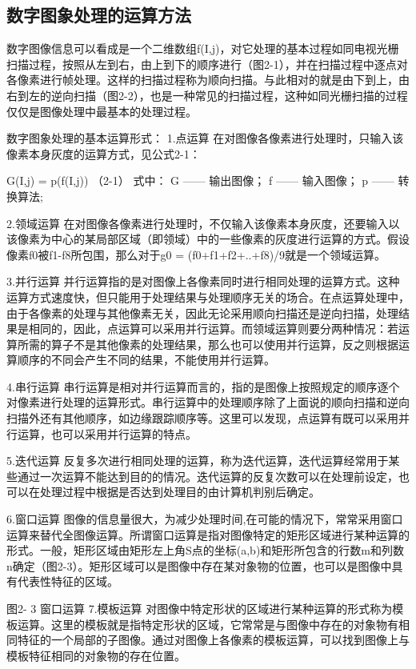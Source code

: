 \documentclass[18pt, twoside, a4paper, dvipdfm]{book}
\begin{document}
\subsection{数字图象处理的运算方法}

 数字图像信息可以看成是一个二维数组f(I,j)，对它处理的基本过程如同电视光栅扫描过程，按照从左到右，由上到下的顺序进行（图2-1），并在扫描过程中逐点对各像素进行帧处理。这样的扫描过程称为顺向扫描。与此相对的就是由下到上，由右到左的逆向扫描（图2-2），也是一种常见的扫描过程，这种如同光栅扫描的过程仅仅是图像处理中最基本的处理过程。


数字图象处理的基本运算形式：
1.点运算
在对图像各像素进行处理时，只输入该像素本身灰度的运算方式，见公式2-1：

G(I,j) = p(f(I,j))											（2-1）
式中： 
G 	—— 输出图像；
f 	—— 输入图像；
p	—— 转换算法;

2.领域运算
在对图像各像素进行处理时，不仅输入该像素本身灰度，还要输入以该像素为中心的某局部区域（即领域）中的一些像素的灰度进行运算的方式。假设像素f0被f1-f8所包围，那么对于g0 = (f0+f1+f2+..+f8)/9就是一个领域运算。

3.并行运算
并行运算指的是对图像上各像素同时进行相同处理的运算方式。这种运算方式速度快，但只能用于处理结果与处理顺序无关的场合。在点运算处理中，由于各像素的处理与其他像素无关，因此无论采用顺向扫描还是逆向扫描，处理结果是相同的，因此，点运算可以采用并行运算。而领域运算则要分两种情况：若运算所需的算子不是其他像素的处理结果，那么也可以使用并行运算，反之则根据运算顺序的不同会产生不同的结果，不能使用并行运算。

4.串行运算
串行运算是相对并行运算而言的，指的是图像上按照规定的顺序逐个对像素进行处理的运算形式。串行运算中的处理顺序除了上面说的顺向扫描和逆向扫描外还有其他顺序，如边缘跟踪顺序等。这里可以发现，点运算有既可以采用并行运算，也可以采用并行运算的特点。

5.迭代运算
反复多次进行相同处理的运算，称为迭代运算，迭代运算经常用于某些通过一次运算不能达到目的的情况。迭代运算的反复次数可以在处理前设定，也可以在处理过程中根据是否达到处理目的由计算机判别后确定。

6.窗口运算
图像的信息量很大，为减少处理时间,在可能的情况下，常常采用窗口运算来替代全图像运算。所谓窗口运算是指对图像特定的矩形区域进行某种运算的形式。一般，矩形区域由矩形左上角S点的坐标(a,b)和矩形所包含的行数m和列数n确定（图2-3）。矩形区域可以是图像中存在某对象物的位置，也可以是图像中具有代表性特征的区域。
 
图2- 3 窗口运算
7.模板运算
对图像中特定形状的区域进行某种运算的形式称为模板运算。这里的模板就是指特定形状的区域，它常常是与图像中存在的对象物有相同特征的一个局部的子图像。通过对图像上各像素的模板运算，可以找到图像上与模板特征相同的对象物的存在位置。
\end{document}
